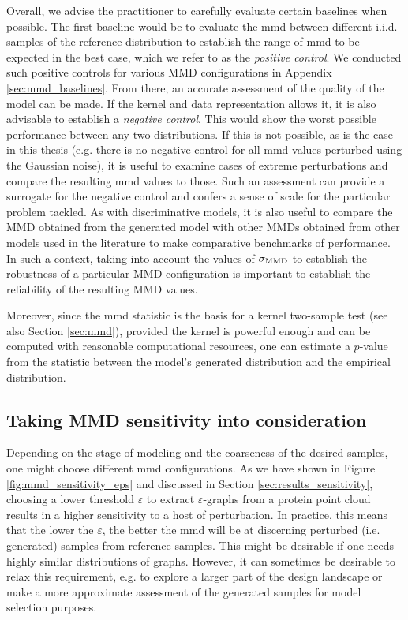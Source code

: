 Overall, we advise the practitioner to carefully evaluate certain baselines when
possible. The first baseline would be to evaluate the \acrshort{mmd} between
different i.i.d. samples of the reference distribution to establish the range of
\acrshort{mmd} to be expected in the best case, which we refer to as the
\emph{positive control}. We conducted such positive controls for various MMD
configurations in Appendix \ref{sec:mmd_baselines}. From there, an accurate
assessment of the quality of the model can be made. If the kernel and data
representation allows it, it is also advisable to establish a \emph{negative
control}. This would show the worst possible performance between any two
distributions. If this is not possible, as is the case in this thesis (e.g.
there is no negative control for all \acrshort{mmd} values perturbed using the
Gaussian noise), it is useful to examine cases of extreme perturbations and
compare the resulting \acrshort{mmd} values to those. Such an assessment can
provide a surrogate for the negative control and confers a sense of scale for
the particular problem tackled. As with discriminative models, it is also useful
to compare the MMD obtained from the generated model with other MMDs obtained
from other models used in the literature to make comparative benchmarks of
performance. In such a context, taking into account the values of $\sigma_{\text{MMD}}$
to establish the robustness of a particular MMD configuration is important to
establish the reliability of the resulting MMD values.

Moreover, since the \acrshort{mmd} statistic is the basis for a kernel
two-sample test \citep{gretton2012kernel} (see also Section \ref{sec:mmd}),
provided the kernel is powerful enough and can be computed with reasonable
computational resources, one can estimate a $p$-value from the statistic between
the model's generated distribution and the empirical distribution.

\subsection{Taking MMD sensitivity into consideration}\label{sec:discussion_right_mmd}
Depending on the stage of modeling and the coarseness of the desired samples,
one might choose different \acrshort{mmd} configurations. As we have shown in Figure
\ref{fig:mmd_sensitivity_eps} and discussed in Section
\ref{sec:results_sensitivity}, choosing a lower threshold $\varepsilon$ to
extract $\varepsilon$-graphs from a protein point cloud results in a higher
sensitivity to a host of perturbation. In practice, this means that the lower the
$\varepsilon$, the better the \acrshort{mmd} will be at discerning perturbed (i.e.
generated) samples from reference samples. This might be desirable if one needs
highly similar distributions of graphs. However, it can sometimes be desirable
to relax this requirement, e.g. to explore a larger part of the design landscape
or make a more approximate assessment of the generated samples for model selection purposes.


